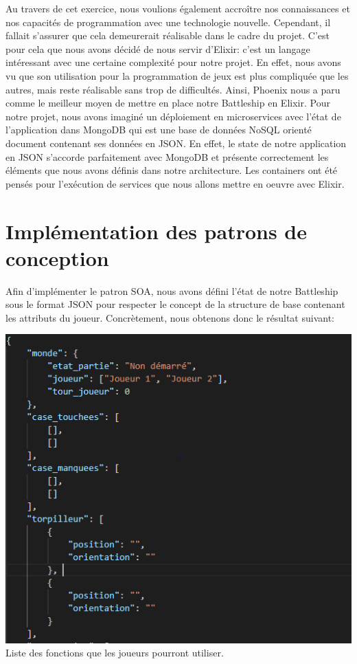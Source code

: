 \documentclass[12pt]{article}
\begin{document}
Au travers de cet exercice, nous voulions également accroître nos connaissances et nos capacités de programmation avec une technologie nouvelle. Cependant, il fallait s'assurer que cela demeurerait réalisable dans le cadre du projet. C'est pour cela que nous avons décidé de nous servir d'Elixir: c'est un langage intéressant avec une certaine complexité pour notre projet. En effet, nous avons vu que son utilisation pour la programmation de jeux est plus compliquée que les autres, mais reste réalisable sans trop de difficultés.
Ainsi, Phoenix nous a paru comme le meilleur moyen de mettre en place notre Battleship en Elixir.
Pour notre projet, nous avons imaginé un déploiement en microservices avec l'état de l'application dans MongoDB qui est une base de données NoSQL orienté document contenant ses données en JSON. En effet, le state de notre application en JSON s'accorde parfaitement avec MongoDB et présente correctement les éléments que nous avons définis dans notre architecture. Les containers ont été pensés pour l'exécution de services que nous allons mettre en oeuvre avec Elixir.

\section{Implémentation des patrons de conception}

 Afin d'implémenter le patron SOA, nous avons défini l'état de notre Battleship sous le format JSON pour respecter le concept de la structure de base contenant les attributs du joueur. Concrètement, nous obtenons donc le résultat suivant:

\begin{center}
\includegraphics[scale = 0.75]{implementation-soa.PNG} \\
Liste des fonctions que les joueurs pourront utiliser.\cite{data_oriented_design}
\\[1.0 cm]
\end{center}
\end{document}

